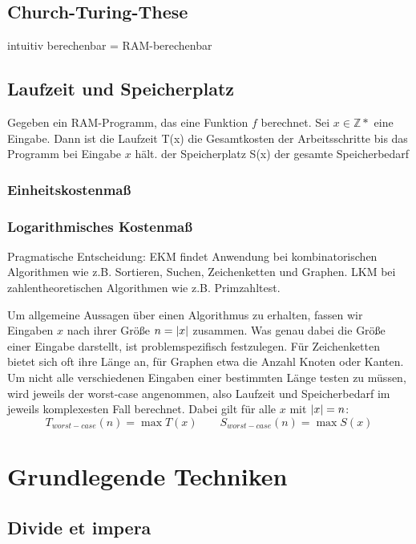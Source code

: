 \subsection{Church-Turing-These}

intuitiv berechenbar = RAM-berechenbar

\subsection{Laufzeit und Speicherplatz}

Gegeben ein RAM-Programm, das eine Funktion $f$ berechnet.
Sei $x \in \mathbb{Z}*$ eine Eingabe. Dann ist
die Laufzeit T(x) die Gesamtkosten der Arbeitsschritte bis das Programm bei Eingabe $x$ hält.
der Speicherplatz S(x) der gesamte Speicherbedarf

\subsubsection{Einheitskostenmaß}
\subsubsection{Logarithmisches Kostenmaß}

Pragmatische Entscheidung: EKM findet Anwendung bei kombinatorischen Algorithmen wie z.B. Sortieren, Suchen, Zeichenketten und Graphen.
LKM bei zahlentheoretischen Algorithmen wie z.B. Primzahltest.

Um allgemeine Aussagen über einen Algorithmus zu erhalten, fassen wir Eingaben $x$ nach ihrer Größe $n = \left|x\right|$ zusammen.
Was genau dabei die Größe einer Eingabe darstellt, ist problemspezifisch festzulegen.
Für Zeichenketten bietet sich oft ihre Länge an, für Graphen etwa die Anzahl Knoten oder Kanten.
Um nicht alle verschiedenen Eingaben einer bestimmten Länge testen zu müssen, wird jeweils der worst-case angenommen,
also Laufzeit und Speicherbedarf im jeweils komplexesten Fall berechnet.
Dabei gilt für alle $x$ mit $\left|x\right| = n$:
$$T_{worst-case}(n) = \max T(x) \qquad S_{worst-case}(n) = \max S(x)$$

\section{Grundlegende Techniken}

\subsection{Divide et impera}

